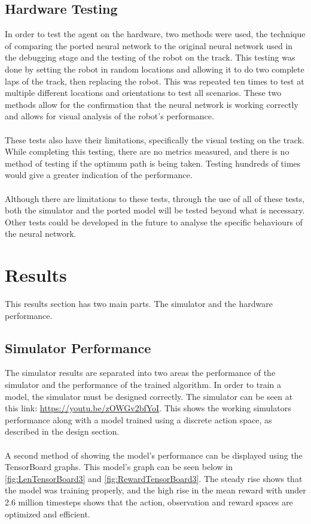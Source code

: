 \documentclass[a4paper,12pt]{article}
\begin{document}
\subsection{Hardware Testing}
In order to test the agent on the hardware, two methods were used, the technique of comparing the ported neural network to the original neural network used in the debugging stage and the testing of the robot on the track. This testing was done by setting the robot in random locations and allowing it to do two complete laps of the track, then replacing the robot. This was repeated ten times to test at multiple different locations and orientations to test all scenarios. These two methods allow for the confirmation that the neural network is working correctly and allows for visual analysis of the robot's performance.
\\\\
These tests also have their limitations, specifically the visual testing on the track. While completing this testing, there are no metrics measured, and there is no method of testing if the optimum path is being taken. Testing hundreds of times would give a greater indication of the performance.
\\\\
Although there are limitations to these tests, through the use of all of these tests, both the simulator and the ported model will be tested beyond what is necessary. Other tests could be developed in the future to analyse the specific behaviours of the neural network. 

\section{Results}

This results section has two main parts. The simulator and the hardware performance.

\subsection{Simulator Performance}
The simulator results are separated into two areas the performance of the simulator and the performance of the trained algorithm. In order to train a model, the simulator must be designed correctly. The simulator can be seen at this link: \url{https://youtu.be/zOWGv2bfYoI}. This shows the working simulators performance along with a model trained using a discrete action space, as described in the design section. 
\\\\
A second method of showing the model's performance can be displayed using the TensorBoard graphs. This model's graph can be seen below in \autoref{fig:LenTensorBoard3} and \autoref{fig:RewardTensorBoard3}. The steady rise shows that the model was training properly, and the high rise in the mean reward with under 2.6 million timesteps shows that the action, observation and reward spaces are optimized and efficient. 
\end{document}
